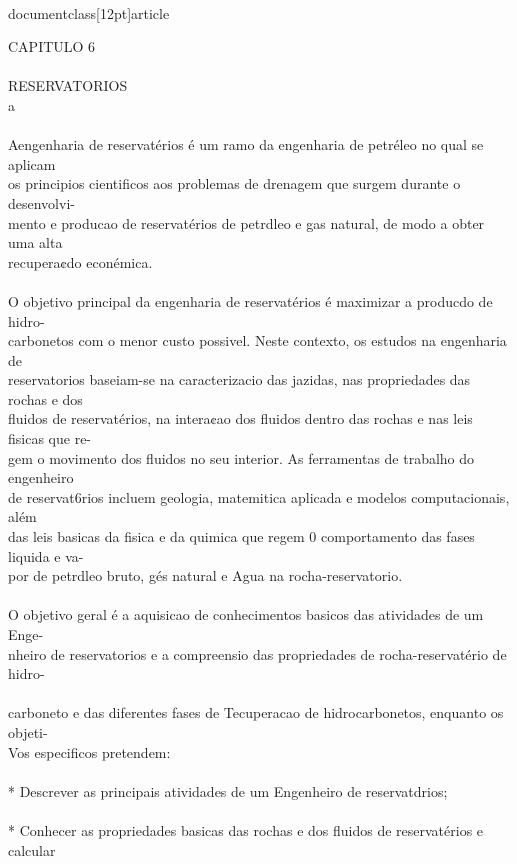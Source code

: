 \\documentclass[12pt]{article}
\begin{document}
CAPITULO 6\\
\\
RESERVATORIOS\\
a\\
\\
Aengenharia de reservatérios é um ramo da engenharia de petréleo no qual se aplicam\\
os principios cientificos aos problemas de drenagem que surgem durante o desenvolvi-\\
mento e producao de reservatérios de petrdleo e gas natural, de modo a obter uma alta\\
recupera¢do econémica.\\
\\
O objetivo principal da engenharia de reservatérios é maximizar a producdo de hidro-\\
carbonetos com o menor custo possivel. Neste contexto, os estudos na engenharia de\\
reservatorios baseiam-se na caracterizacio das jazidas, nas propriedades das rochas e dos\\
fluidos de reservatérios, na intera¢ao dos fluidos dentro das rochas e nas leis fisicas que re-\\
gem o movimento dos fluidos no seu interior. As ferramentas de trabalho do engenheiro\\
de reservat6rios incluem geologia, matemitica aplicada e modelos computacionais, além\\
das leis basicas da fisica e da quimica que regem 0 comportamento das fases liquida e va-\\
por de petrdleo bruto, gés natural e Agua na rocha-reservatorio.\\
\\
O objetivo geral é a aquisicao de conhecimentos basicos das atividades de um Enge-\\
nheiro de reservatorios e a compreensio das propriedades de rocha-reservatério de hidro-\\
\\
carboneto e das diferentes fases de Tecuperacao de hidrocarbonetos, enquanto os objeti-\\
Vos especificos pretendem:\\
\\
* Descrever as principais atividades de um Engenheiro de reservatdrios;\\
\\
* Conhecer as propriedades basicas das rochas e dos fluidos de reservatérios e calcular\\
\end{document}
